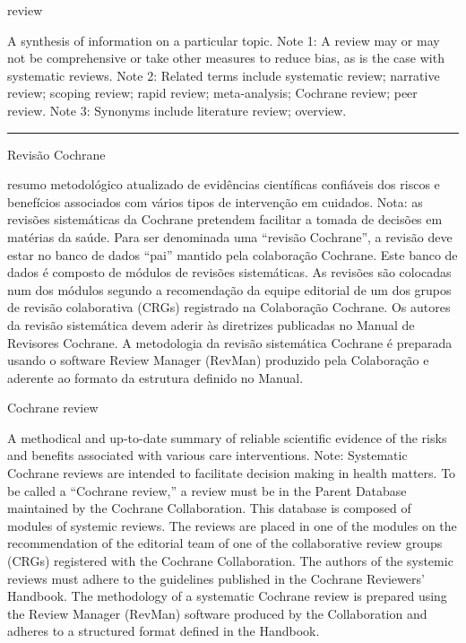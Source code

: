\documentclass[
]{book}
\begin{document}
review

A synthesis of information on a particular topic. Note 1: A review may or may not be comprehensive or take other measures to reduce bias, as is the case with systematic reviews. Note 2: Related terms include systematic review; narrative review; scoping review; rapid review; meta-analysis; Cochrane review; peer review. Note 3: Synonyms include literature review; overview.

\begin{center}\rule{0.5\linewidth}{0.5pt}\end{center}

Revisão Cochrane

resumo metodológico atualizado de evidências científicas confiáveis dos riscos e benefícios associados com vários tipos de intervenção em cuidados. Nota: as revisões sistemáticas da Cochrane pretendem facilitar a tomada de decisões em matérias da saúde. Para ser denominada uma ``revisão Cochrane'', a revisão deve estar no banco de dados ``pai'' mantido pela colaboração Cochrane. Este banco de dados é composto de módulos de revisões sistemáticas. As revisões são colocadas num dos módulos segundo a recomendação da equipe editorial de um dos grupos de revisão colaborativa (CRGs) registrado na Colaboração Cochrane. Os autores da revisão sistemática devem aderir às diretrizes publicadas no Manual de Revisores Cochrane. A metodologia da revisão sistemática Cochrane é preparada usando o software Review Manager (RevMan) produzido pela Colaboração e aderente ao formato da estrutura definido no Manual.

Cochrane review

A methodical and up-to-date summary of reliable scientific evidence of the risks and benefits associated with various care interventions. Note: Systematic Cochrane reviews are intended to facilitate decision making in health matters. To be called a ``Cochrane review,'' a review must be in the Parent Database maintained by the Cochrane Collaboration. This database is composed of modules of systemic reviews. The reviews are placed in one of the modules on the recommendation of the editorial team of one of the collaborative review groups (CRGs) registered with the Cochrane Collaboration. The authors of the systemic reviews must adhere to the guidelines published in the Cochrane Reviewers' Handbook. The methodology of a systematic Cochrane review is prepared using the Review Manager (RevMan) software produced by the Collaboration and adheres to a structured format defined in the Handbook.
\end{document}
